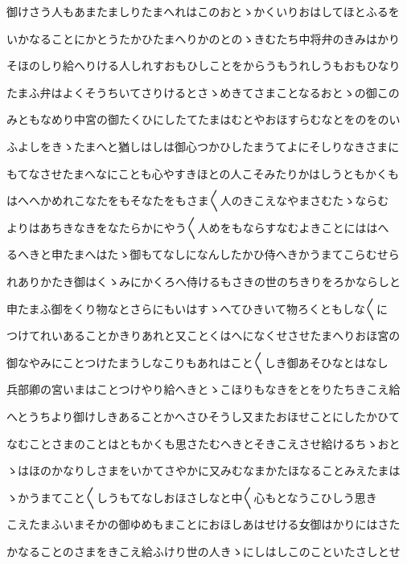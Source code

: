 \documentclass[a4paper,11pt,landscape]{ltjtarticle}
\begin{document}
\par\medskip
御けさう人もあまたましりたまへれはこのおとゝかくいりおはしてほとふるを
\par\medskip
いかなることにかとうたかひたまへりかのとのゝきむたち中将弁のきみはかり
\par\medskip
そほのしり給へりける人しれすおもひしことをからうもうれしうもおもひなり
\par\medskip
たまふ弁はよくそうちいてさりけるとさゝめきてさまことなるおとゝの御この
\par\medskip
みともなめり中宮の御たくひにしたてたまはむとやおほすらむなとをのをのい
\par\medskip
ふよしをきゝたまへと猶しはしは御心つかひしたまうてよにそしりなきさまに
\par\medskip
もてなさせたまへなにことも心やすきほとの人こそみたりかはしうともかくも
\par\medskip
はへへかめれこなたをもそなたをもさま〱人のきこえなやまさむたゝならむ
\par\medskip
よりはあちきなきをなたらかにやう〱人めをもならすなむよきことにははへ
\par\medskip
るへきと申たまへはたゝ御もてなしになんしたかひ侍へきかうまてこらむせら
\par\medskip
れありかたき御はくゝみにかくろへ侍けるもさきの世のちきりをろかならしと
\par\medskip
申たまふ御をくり物なとさらにもいはすゝへてひきいて物ろくともしな〱に
\par\medskip
つけてれいあることかきりあれと又ことくはへになくせさせたまへりおほ宮の
\par\medskip
御なやみにことつけたまうしなこりもあれはこと〱しき御あそひなとはなし
\par\medskip
兵部卿の宮いまはことつけやり給へきとゝこほりもなきをとをりたちきこえ給
\par\medskip
へとうちより御けしきあることかへさひそうし又またおほせことにしたかひて
\par\medskip
なむことさまのことはともかくも思さたむへきとそきこえさせ給けるちゝおと
\par\medskip
ゝはほのかなりしさまをいかてさやかに又みむなまかたほなることみえたまは
\par\medskip
ゝかうまてこと〱しうもてなしおほさしなと中〱心もとなうこひしう思き
\par\medskip
こえたまふいまそかの御ゆめもまことにおほしあはせける女御はかりにはさた
\par\medskip
かなることのさまをきこえ給ふけり世の人きゝにしはしこのこといたさしとせ
\par\medskip
\end{document}
